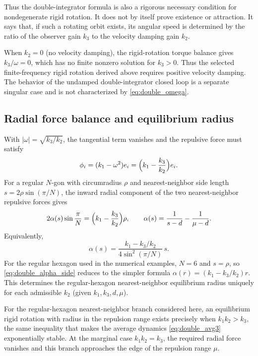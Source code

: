 Thus the double-integrator formula is also a rigorous necessary condition for nondegenerate rigid
rotation. It does not by itself prove existence or attraction. It says that, if such a rotating
orbit exists, its angular speed is determined by the ratio of the observer gain $k_3$ to the
velocity damping gain $k_2$.

\begin{remark}[The $k_2=0$ limiting case]
When $k_2=0$ (no velocity damping), the rigid-rotation torque balance gives $k_3/\omega=0$, which
has no finite nonzero solution for $k_3>0$. Thus the selected finite-frequency rigid rotation derived
above requires positive velocity damping. The behavior of the undamped double-integrator closed loop
is a separate singular case and is not characterized by \eqref{eq:double_omega}.
\end{remark}

\subsection{Radial force balance and equilibrium radius}
\label{sec:double_radial}

With $|\omega|=\sqrt{k_3/k_2}$, the tangential term vanishes and the repulsive force must satisfy
\begin{equation}
  \phi_i = (k_1-\omega^2) e_i = \Bigl(k_1-\frac{k_3}{k_2}\Bigr) e_i .
  \label{eq:double_radial}
\end{equation}
For a regular $N$-gon with circumradius $\rho$ and nearest-neighbor side length
$s=2\rho\sin(\pi/N)$, the inward radial component of the two nearest-neighbor repulsive forces gives
\begin{equation}
  2\alpha(s)\sin\frac{\pi}{N}
  =\Bigl(k_1-\frac{k_3}{k_2}\Bigr)\rho,
  \qquad
  \alpha(s)=\frac{1}{s-d}-\frac{1}{\mu-d} .
  \label{eq:double_alpha}
\end{equation}
Equivalently,
\begin{equation}
  \alpha(s)=\frac{k_1-k_3/k_2}{4\sin^2(\pi/N)}\,s .
  \label{eq:double_alpha_side}
\end{equation}
For the regular hexagon used in the numerical examples, $N=6$ and $s=\rho$, so
\eqref{eq:double_alpha_side} reduces to the simpler formula
$\alpha(r)=(k_1-k_3/k_2)r$. This determines the regular-hexagon nearest-neighbor equilibrium radius
uniquely for each admissible $k_2$ (given $k_1,k_3,d,\mu$).

\begin{proposition}
For the regular-hexagon nearest-neighbor branch considered here, an equilibrium rigid rotation with
radius in the repulsion range exists precisely when $k_1k_2>k_3$, the same inequality that makes the
average dynamics \eqref{eq:double_avg3} exponentially stable. At the marginal case
$k_1k_2=k_3$, the required radial force vanishes and this branch approaches the edge of the
repulsion range $\mu$.
\end{proposition}

